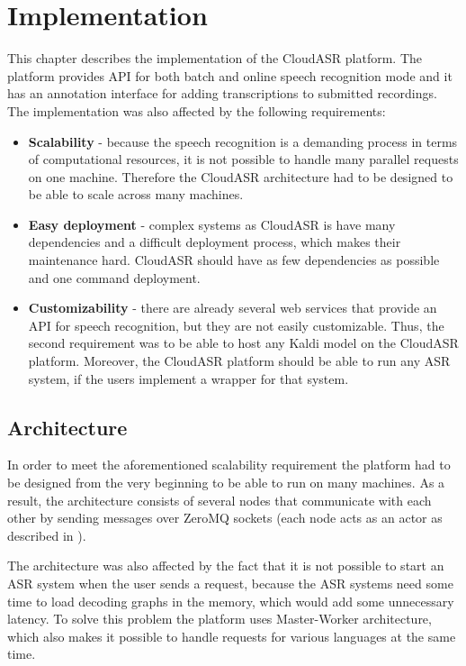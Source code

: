 \chapter{Implementation}
This chapter describes the implementation of the CloudASR platform.
The platform provides API for both batch and online speech recognition mode
  and it has an annotation interface for adding transcriptions to submitted recordings.
The implementation was also affected by the following requirements:

\begin{itemize}
  \item
    \textbf{Scalability} -
      because the speech recognition is a demanding process in terms of computational resources,
        it is not possible to handle many parallel requests on one machine.
      Therefore the CloudASR architecture had to be designed to be able to scale across many machines.

  \item
    \textbf{Easy deployment} -
      complex systems as CloudASR is have many dependencies and a difficult deployment process,
        which makes their maintenance hard.
      CloudASR should have as few dependencies as possible and one command deployment.

  \item
    \textbf{Customizability} -
       there are already several web services that provide an API for speech recognition,
         but they are not easily customizable.
       Thus, the second requirement was to be able to host any Kaldi model on  the CloudASR platform.
       Moreover, the CloudASR platform should be able to run any ASR system,
         if the users implement a wrapper for that system.

\end{itemize}


\section{Architecture}
In order to meet the aforementioned scalability requirement
  the platform had to be designed from the very beginning to be able to run on many machines.
As a result, the architecture consists of several nodes
  that communicate with each other by sending messages over ZeroMQ sockets
  (each node acts as an actor as described in \cite{hewitt1977viewing}).

The architecture was also affected by the fact
  that it is not possible to start an ASR system when the user sends a request,
  because the ASR systems need some time to load decoding graphs in the memory,
  which would add some unnecessary latency.
To solve this problem the platform uses Master-Worker architecture,
  which also makes it possible to handle requests for various languages at the same time.


